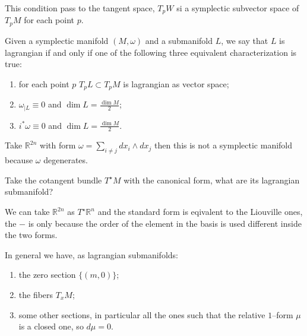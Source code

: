 \documentclass[misc]{subfiles}
\begin{document}
\begin{Rmk}
    This condition pass to the tangent space, $T_pW$ si a symplectic subvector space of $T_pM$ for each point $p$.
\end{Rmk}

\begin{Dfn}
    Given a symplectic manifold $(M,\omega)$ and a submanifold $L$, we say that $L$ is lagrangian if and only if one of the following three equivalent characterization is true:

    \begin{enumerate}[label=\DfnLbl]

        \item for each point $p$ $T_pL \subset T_pM$ is lagrangian as vector space;

        \item $\omega_{|L} \equiv 0$ and $\dim L = \frac{\dim M}{2}$;

        \item $i^\ast\omega \equiv 0$ and $\dim L= \frac{\dim M}{2}$.
    \end{enumerate}
\end{Dfn}

\begin{Exc}
    Take $\mathbb{R}^{2n}$ with form $\omega=\sum_{i \neq j} dx_i \wedge dx_j$ then this is not a symplectic manifold because $\omega$ degenerates.
\end{Exc}

\begin{Exp}
    Take the cotangent bundle $T^\star M$ with the canonical form, what are its lagrangian submanifold?

    We can take $\mathbb{R}^{2n}$ as $T^\star\mathbb{R}^n$ and the standard form is eqivalent to the Liouville ones, the $-$ is only because the order of the element in the basis is used different inside the two forms.

    In general we have, as lagrangian submanifolds:
    \begin{enumerate}[label=\ExpLbl]
        \item the zero section $\{(m,0)\}$;

        \item the fibers $T_xM$;

        \item some other sections, in particular all the ones such that the relative $1$--form $\mu$ is a closed one, so $d\mu=0$.
    \end{enumerate}
\end{Exp}
\end{document}
